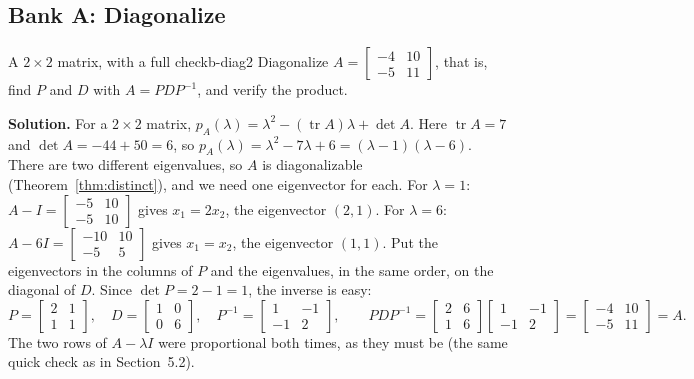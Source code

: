 \documentclass[11pt]{article}
\begin{document}
\subsection*{Bank A: Diagonalize}
\begin{exmp}{A $2\times2$ matrix, with a full check}{b-diag2}
Diagonalize $A=\begin{bmatrix}-4&10\\-5&11\end{bmatrix}$, that is, find $P$ and $D$ with $A=PDP^{-1}$, and verify the product.

\textbf{Solution.} For a $2\times2$ matrix, $p_A(\lambda)=\lambda^2-(\operatorname{tr}A)\lambda+\det A$. Here $\operatorname{tr}A=7$ and $\det A=-44+50=6$, so $p_A(\lambda)=\lambda^2-7\lambda+6=(\lambda-1)(\lambda-6)$. There are two different eigenvalues, so $A$ is diagonalizable (Theorem~\ref{thm:distinct}), and we need one eigenvector for each. For $\lambda=1$: $A-I=\begin{bmatrix}-5&10\\-5&10\end{bmatrix}$ gives $x_1=2x_2$, the eigenvector $(2,1)$. For $\lambda=6$: $A-6I=\begin{bmatrix}-10&10\\-5&5\end{bmatrix}$ gives $x_1=x_2$, the eigenvector $(1,1)$. Put the eigenvectors in the columns of $P$ and the eigenvalues, in the same order, on the diagonal of $D$. Since $\det P=2-1=1$, the inverse is easy:
\[
P=\begin{bmatrix}2&1\\1&1\end{bmatrix},\quad D=\begin{bmatrix}1&0\\0&6\end{bmatrix},\quad P^{-1}=\begin{bmatrix}1&-1\\-1&2\end{bmatrix},\qquad PDP^{-1}=\begin{bmatrix}2&6\\1&6\end{bmatrix}\begin{bmatrix}1&-1\\-1&2\end{bmatrix}=\begin{bmatrix}-4&10\\-5&11\end{bmatrix}=A.
\]
The two rows of $A-\lambda I$ were proportional both times, as they must be (the same quick check as in Section~5.2).
\end{exmp}
\end{document}
